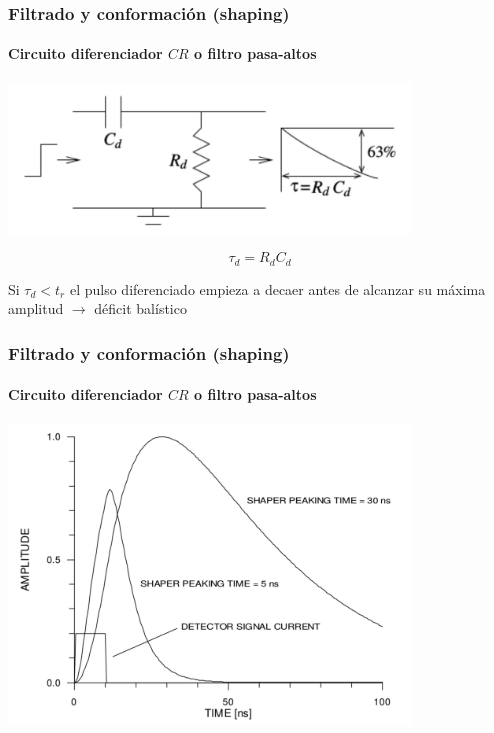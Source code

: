 \documentclass{beamer}
\begin{document}
\begin{frame}
\frametitle{Filtrado y conformación (shaping)}
\framesubtitle{{\color{blue}Circuito diferenciador $CR$ o filtro pasa-altos}}
\begin{center}
\includegraphics[width=0.8\textwidth]{d2/cr_differentiator2}
\end{center}
$$\tau_d = R_d C_d$$

\begin{alertblock}{}
Si $\tau_d < t_r$ el pulso diferenciado empieza a decaer antes de alcanzar su 
máxima amplitud $\rightarrow$ \alert{déficit balístico}
\end{alertblock}
\end{frame}

\begin{frame}
\frametitle{Filtrado y conformación (shaping)}
\framesubtitle{{\color{blue}Circuito diferenciador $CR$ o filtro pasa-altos}}
\begin{center}
\includegraphics[width=0.8\textwidth]{d2/deficit_balistico}
\end{center}
\end{frame}
\end{document}
